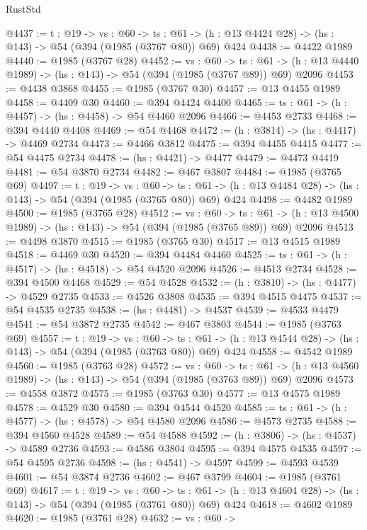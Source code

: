 \begin{lexlean}{RustStd}
\begin{coremodule}
@4437 := {t : @19} ->
  {vs : @60} ->
  {ts : @61} -> (h : @13 @4424 @28) -> (hs : @143) -> @54 (@394 (@1985 (@3767 @80)) @69) @424
@4438 := @4422 @1989
@4440 := @1985 (@3767 @28)
@4452 := {vs : @60} ->
  {ts : @61} -> (h : @13 @4440 @1989) -> (hs : @143) -> @54 (@394 (@1985 (@3767 @89)) @69) @2096
@4453 := @4438 @3868
@4455 := @1985 (@3767 @30)
@4457 := @13 @4455 @1989
@4458 := @4409 @30
@4460 := @394 @4424 @4400
@4465 := {ts : @61} -> (h : @4457) -> (hs : @4458) -> @54 @4460 @2096
@4466 := @4453 @2733
@4468 := @394 @4440 @4408
@4469 := @54 @4468
@4472 := (h : @3814) -> (hs : @4417) -> @4469 @2734
@4473 := @4466 @3812
@4475 := @394 @4455 @4415
@4477 := @54 @4475 @2734
@4478 := (hs : @4421) -> @4477
@4479 := @4473 @4419
@4481 := @54 @3870 @2734
@4482 := @467 @3807
@4484 := @1985 (@3765 @69)
@4497 := {t : @19} ->
  {vs : @60} ->
  {ts : @61} -> (h : @13 @4484 @28) -> (hs : @143) -> @54 (@394 (@1985 (@3765 @80)) @69) @424
@4498 := @4482 @1989
@4500 := @1985 (@3765 @28)
@4512 := {vs : @60} ->
  {ts : @61} -> (h : @13 @4500 @1989) -> (hs : @143) -> @54 (@394 (@1985 (@3765 @89)) @69) @2096
@4513 := @4498 @3870
@4515 := @1985 (@3765 @30)
@4517 := @13 @4515 @1989
@4518 := @4469 @30
@4520 := @394 @4484 @4460
@4525 := {ts : @61} -> (h : @4517) -> (hs : @4518) -> @54 @4520 @2096
@4526 := @4513 @2734
@4528 := @394 @4500 @4468
@4529 := @54 @4528
@4532 := (h : @3810) -> (hs : @4477) -> @4529 @2735
@4533 := @4526 @3808
@4535 := @394 @4515 @4475
@4537 := @54 @4535 @2735
@4538 := (hs : @4481) -> @4537
@4539 := @4533 @4479
@4541 := @54 @3872 @2735
@4542 := @467 @3803
@4544 := @1985 (@3763 @69)
@4557 := {t : @19} ->
  {vs : @60} ->
  {ts : @61} -> (h : @13 @4544 @28) -> (hs : @143) -> @54 (@394 (@1985 (@3763 @80)) @69) @424
@4558 := @4542 @1989
@4560 := @1985 (@3763 @28)
@4572 := {vs : @60} ->
  {ts : @61} -> (h : @13 @4560 @1989) -> (hs : @143) -> @54 (@394 (@1985 (@3763 @89)) @69) @2096
@4573 := @4558 @3872
@4575 := @1985 (@3763 @30)
@4577 := @13 @4575 @1989
@4578 := @4529 @30
@4580 := @394 @4544 @4520
@4585 := {ts : @61} -> (h : @4577) -> (hs : @4578) -> @54 @4580 @2096
@4586 := @4573 @2735
@4588 := @394 @4560 @4528
@4589 := @54 @4588
@4592 := (h : @3806) -> (hs : @4537) -> @4589 @2736
@4593 := @4586 @3804
@4595 := @394 @4575 @4535
@4597 := @54 @4595 @2736
@4598 := (hs : @4541) -> @4597
@4599 := @4593 @4539
@4601 := @54 @3874 @2736
@4602 := @467 @3799
@4604 := @1985 (@3761 @69)
@4617 := {t : @19} ->
  {vs : @60} ->
  {ts : @61} -> (h : @13 @4604 @28) -> (hs : @143) -> @54 (@394 (@1985 (@3761 @80)) @69) @424
@4618 := @4602 @1989
@4620 := @1985 (@3761 @28)
@4632 := {vs : @60} ->

\end{coremodule}
\end{lexlean}

